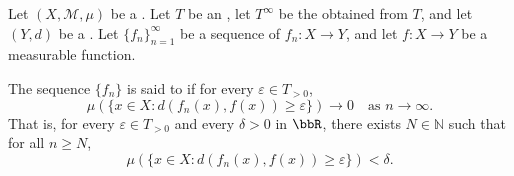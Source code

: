 \begin{definition} \label{definition:convergence_in_measure_for_a_sequence_of_measurable_functions_on_a_measure_space_into_a_metric_space}
Let $(X, \mathcal{M}, \mu)$ be a . Let $T$ be an , let $T^\infty$ be the  obtained from $T$, and let $(Y, d)$ be a . Let $\{f_n\}_{n=1}^\infty$ be a sequence of  $f_n: X \to Y$, and let $f: X \to Y$ be a measurable function.

The sequence $\{f_n\}$ is said to  if for every $\varepsilon \in T_{>0}$,
$$\mu(\{x \in X : d(f_n(x), f(x)) \geq \varepsilon\}) \to 0 \quad \text{as } n \to \infty.$$
That is, for every $\varepsilon \in T_{>0}$ and every $\delta > 0$ in $\bbR$, there exists $N \in \mathbb{N}$ such that for all $n \geq N$,
$$\mu(\{x \in X : d(f_n(x), f(x)) \geq \varepsilon\}) < \delta.$$
\end{definition}